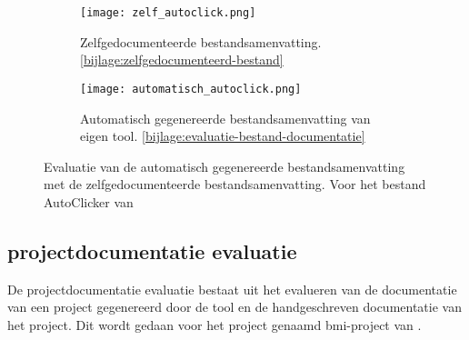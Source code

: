 \begin{figure}
    \centering
    \begin{subfigure}[b]{1\textwidth}
        \centering
        \texttt{[image: zelf\_autoclick.png]}
        \caption{Zelfgedocumenteerde bestandsamenvatting. \ref{bijlage:zelfgedocumenteerd-bestand}}
        \label{fig:zelfgedocumenteerd-bestandsamenvatting}
    \end{subfigure}
    \hfill
    \begin{subfigure}[b]{1\textwidth}
        \centering
        \texttt{[image: automatisch\_autoclick.png]}
        \caption{Automatisch gegenereerde bestandsamenvatting van eigen tool. \ref{bijlage:evaluatie-bestand-documentatie}}
        \label{fig:automatisch-bestandsamenvatting}
    \end{subfigure}
    \caption{Evaluatie van de automatisch gegenereerde bestandsamenvatting met de zelfgedocumenteerde bestandsamenvatting. Voor het bestand AutoClicker van \textcite{Waegeneer2022}}
    \label{fig:evaluatie-bestand-documentatie}
\end{figure}


\subsection{projectdocumentatie evaluatie}
\label{sec:project-documentatie-evaluatie-project}

De projectdocumentatie evaluatie bestaat uit het evalueren van de documentatie van een project gegenereerd door de tool en de handgeschreven documentatie van het project.
Dit wordt gedaan voor het project genaamd bmi-project van \textcite{Simmons2019}.

\begin{table}
    \caption{Evaluatie van de documentatie van het project bmi-project van \textcite{Simmons2019}}
    \label{table:projecten-evaluatie}
\end{table}

